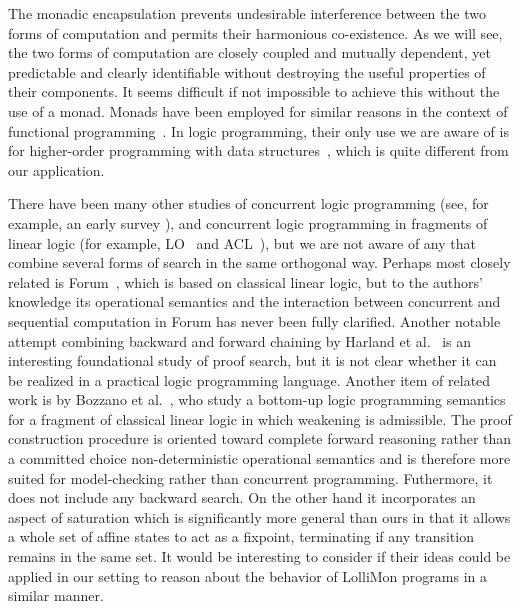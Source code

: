 \documentclass{sig-alt}
\begin{document}
The monadic encapsulation prevents undesirable interference between
the two forms of computation and permits their harmonious
co-existence.  As we will see, the two forms of computation are
closely coupled and mutually dependent, yet predictable and clear\-ly
identifiable without destroying the useful properties of their
components.  It seems difficult if not impossible to achieve this
without the use of a monad.  Monads have been employed for similar
reasons in the context of functional programming~\cite{Wadler92popl}.
In logic programming, their only use we are aware of is for
higher-order programming with data structures~\cite{Bekkers95ilps,McGrail97},
which is quite different from our application.

There have been many other studies of concurrent logic programming (see,
for example, an early survey \cite{Shapiro89}), and concurrent logic
programming in fragments of linear logic (for example, LO~\cite{Andreoli90oopsla} and
ACL~\cite{Kobayashi94tr}), but we are not aware of
any that combine several forms of search in the same orthogonal way.
Perhaps most closely related is Forum~\cite{Miller96tcs}, which is based on
classical linear logic, but to the authors' knowledge its operational
semantics and the interaction between concurrent and sequential
computation in Forum has never been fully clarified.  Another notable
attempt combining backward and forward chaining by Harland et
al.\ \cite{Harland00pstt} is an interesting foundational study of proof
search, but it is not clear whether it can be realized in a practical
logic programming language.
Another item of related work is by Bozzano et al.~\cite{Bozzano04tplp},
who study a bottom-up logic programming semantics for a fragment of
classical linear logic in which weakening is admissible.  The proof
construction procedure is oriented toward complete forward reasoning
rather than a committed choice non-deterministic operational semantics
and is therefore more suited for model-checking rather than concurrent
programming.  Futhermore, it does not include any backward search.  On
the other hand it incorporates an aspect of saturation which is
significantly more general than ours in that it allows a whole set of
affine states to act as a fixpoint, terminating if any transition
remains in the same set.  It would be interesting to consider if their
ideas could be applied in our setting to reason about the behavior of
LolliMon programs in a similar manner.
\end{document}
